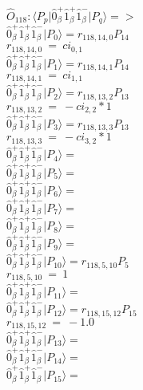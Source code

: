 \documentclass[14pt]{article}
\begin{document}
    $\hat{O}_{118}:  \langle{P_p}\vert \hat{0}_{\beta}^{+}\hat{1}_{\beta}^{+}\hat{1}_{\beta}^{-} \vert{P_q}\rangle => $ \\ 
    $ \hat{0}_{\beta}^{+}\hat{1}_{\beta}^{+}\hat{1}_{\beta}^{-} \vert{P_{0}}\rangle = {r}_{118,14,0}P_{14} $ \\ 
    ${r}_{118,14,0}\ =\ {ci}_{0,1} $ \\ 
    $ \hat{0}_{\beta}^{+}\hat{1}_{\beta}^{+}\hat{1}_{\beta}^{-} \vert{P_{1}}\rangle = {r}_{118,14,1}P_{14} $ \\ 
    ${r}_{118,14,1}\ =\ {ci}_{1,1} $ \\ 
    $ \hat{0}_{\beta}^{+}\hat{1}_{\beta}^{+}\hat{1}_{\beta}^{-} \vert{P_{2}}\rangle = {r}_{118,13,2}P_{13} $ \\ 
    ${r}_{118,13,2}\ =\ -{ci}_{2,2}*1 $ \\ 
    $ \hat{0}_{\beta}^{+}\hat{1}_{\beta}^{+}\hat{1}_{\beta}^{-} \vert{P_{3}}\rangle = {r}_{118,13,3}P_{13} $ \\ 
    ${r}_{118,13,3}\ =\ -{ci}_{3,2}*1 $ \\ 
    $ \hat{0}_{\beta}^{+}\hat{1}_{\beta}^{+}\hat{1}_{\beta}^{-} \vert{P_{4}}\rangle =  $ \\ 
    $ \hat{0}_{\beta}^{+}\hat{1}_{\beta}^{+}\hat{1}_{\beta}^{-} \vert{P_{5}}\rangle =  $ \\ 
    $ \hat{0}_{\beta}^{+}\hat{1}_{\beta}^{+}\hat{1}_{\beta}^{-} \vert{P_{6}}\rangle =  $ \\ 
    $ \hat{0}_{\beta}^{+}\hat{1}_{\beta}^{+}\hat{1}_{\beta}^{-} \vert{P_{7}}\rangle =  $ \\ 
    $ \hat{0}_{\beta}^{+}\hat{1}_{\beta}^{+}\hat{1}_{\beta}^{-} \vert{P_{8}}\rangle =  $ \\ 
    $ \hat{0}_{\beta}^{+}\hat{1}_{\beta}^{+}\hat{1}_{\beta}^{-} \vert{P_{9}}\rangle =  $ \\ 
    $ \hat{0}_{\beta}^{+}\hat{1}_{\beta}^{+}\hat{1}_{\beta}^{-} \vert{P_{10}}\rangle = {r}_{118,5,10}P_{5} $ \\ 
    ${r}_{118,5,10}\ =\ 1 $ \\ 
    $ \hat{0}_{\beta}^{+}\hat{1}_{\beta}^{+}\hat{1}_{\beta}^{-} \vert{P_{11}}\rangle =  $ \\ 
    $ \hat{0}_{\beta}^{+}\hat{1}_{\beta}^{+}\hat{1}_{\beta}^{-} \vert{P_{12}}\rangle = {r}_{118,15,12}P_{15} $ \\ 
    ${r}_{118,15,12}\ =\ -1.0 $ \\ 
    $ \hat{0}_{\beta}^{+}\hat{1}_{\beta}^{+}\hat{1}_{\beta}^{-} \vert{P_{13}}\rangle =  $ \\ 
    $ \hat{0}_{\beta}^{+}\hat{1}_{\beta}^{+}\hat{1}_{\beta}^{-} \vert{P_{14}}\rangle =  $ \\ 
    $ \hat{0}_{\beta}^{+}\hat{1}_{\beta}^{+}\hat{1}_{\beta}^{-} \vert{P_{15}}\rangle =  $ \\ 
    
\end{document}
